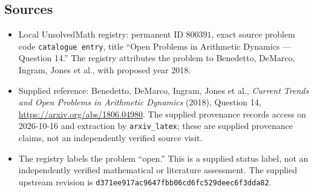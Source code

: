 \documentclass[11pt]{article}
\begin{document}
\subsection{Sources}
\begin{itemize}
\item Local UnsolvedMath registry: permanent ID \(800391\), exact source problem code \texttt{catalogue entry}, title ``Open Problems in Arithmetic Dynamics --- Question 14.'' The registry attributes the problem to Benedetto, DeMarco, Ingram, Jones et al., with proposed year 2018.
\item Supplied reference: Benedetto, DeMarco, Ingram, Jones et al., \emph{Current Trends and Open Problems in Arithmetic Dynamics} (2018), Question 14, \url{https://arxiv.org/abs/1806.04980}. The supplied provenance records access on 2026-10-16 and extraction by \texttt{arxiv\_latex}; these are supplied provenance claims, not an independently verified source visit.
\item The registry labels the problem ``open.'' This is a supplied status label, not an independently verified mathematical or literature assessment. The supplied upstream revision is \texttt{d371ee917ac9647fbb06cd6fc529deec6f3dda82}.
\end{itemize}
\end{document}

